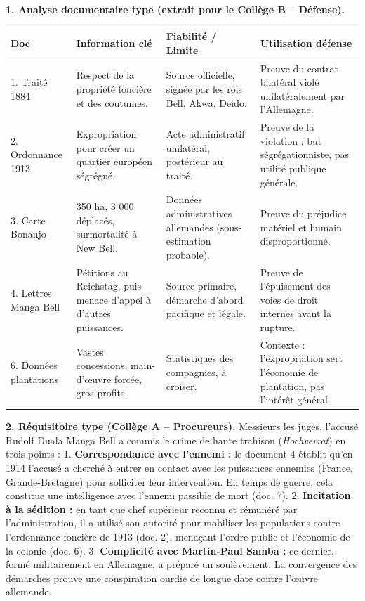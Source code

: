 \documentclass[11pt]{article}
\newcounter{popsec}
\newcounter{popsub}
\newcommand{\courssub}[1]{%
  \stepcounter{popsub}%
  \par\vspace{9pt}\noindent{\popxbold\fontsize{11.5}{13}\selectfont\color{popink}{\color{poporange}\thepopsec.\thepopsub}\hspace{6pt}#1}\par\nopagebreak\vspace{4pt}
}
\begin{document}
\courssub{Démarche et corrigé commenté}
\begin{exoresolu}
\textbf{1. Analyse documentaire type (extrait pour le Collège B -- Défense).}
\begin{center}
\begin{tabularx}{\linewidth}{|l|X|X|X|}\hline
\textbf{Doc} & \textbf{Information clé} & \textbf{Fiabilité / Limite} & \textbf{Utilisation défense} \\ \hline
1. Traité 1884 & Respect de la propriété foncière et des coutumes. & Source officielle, signée par les rois Bell, Akwa, Deido. & Preuve du contrat bilatéral violé unilatéralement par l'Allemagne. \\ \hline
2. Ordonnance 1913 & Expropriation pour créer un quartier européen ségrégué. & Acte administratif unilatéral, postérieur au traité. & Preuve de la violation : but ségrégationniste, pas utilité publique générale. \\ \hline
3. Carte Bonanjo & 350 ha, 3 000 déplacés, surmortalité à New Bell. & Données administratives allemandes (sous-estimation probable). & Preuve du préjudice matériel et humain disproportionné. \\ \hline
4. Lettres Manga Bell & Pétitions au Reichstag, puis menace d'appel à d'autres puissances. & Source primaire, démarche d'abord pacifique et légale. & Preuve de l'épuisement des voies de droit internes avant la rupture. \\ \hline
6. Données plantations & Vastes concessions, main-d'œuvre forcée, gros profits. & Statistiques des compagnies, à croiser. & Contexte : l'expropriation sert l'économie de plantation, pas l'intérêt général. \\ \hline
\end{tabularx}
\end{center}

\textbf{2. Réquisitoire type (Collège A -- Procureurs).}
\og Messieurs les juges, l'accusé Rudolf Duala Manga Bell a commis le crime de haute trahison (\emph{Hochverrat}) en trois points :
1. \textbf{Correspondance avec l'ennemi :} le document 4 établit qu'en 1914 l'accusé a cherché à entrer en contact avec les puissances ennemies (France, Grande-Bretagne) pour solliciter leur intervention. En temps de guerre, cela constitue une intelligence avec l'ennemi passible de mort (doc. 7).
2. \textbf{Incitation à la sédition :} en tant que chef supérieur reconnu et rémunéré par l'administration, il a utilisé son autorité pour mobiliser les populations contre l'ordonnance foncière de 1913 (doc. 2), menaçant l'ordre public et l'économie de la colonie (doc. 6).
3. \textbf{Complicité avec Martin-Paul Samba :} ce dernier, formé militairement en Allemagne, a préparé un soulèvement. La convergence des démarches prouve une conspiration ourdie de longue date contre l'œuvre allemande. \fg


\end{exoresolu}
\end{document}
